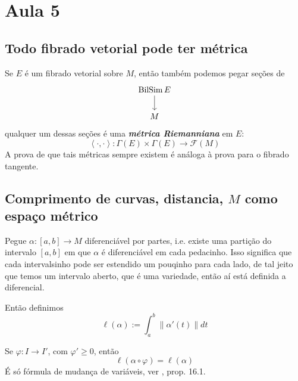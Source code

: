 \section{Aula 5}

\subsection{Todo fibrado vetorial pode ter métrica}

\begin{remark}\leavevmode
Se \(E\) é um fibrado vetorial sobre \(M\), então também podemos pegar seções de
 \[\begin{tikzcd}
\operatorname{B i l Si m}E\arrow[d]\\
M
\end{tikzcd}\]
qualquer um dessas seções é uma \textit{\textbf{métrica Riemanniana}} em \(E\):
\[\left<\cdot,\cdot\right>: \Gamma(E)\times \Gamma(E)\longrightarrow \mathcal{F}(M)\]
A prova de que tais métricas sempre existem é análoga à prova para o fibrado tangente.
\end{remark}

\subsection{Comprimento de curvas, distancia, \(M\) como espaço métrico}

Pegue \(\alpha:[a,b]\longrightarrow M\) diferenciável por partes, i.e. existe uma partição do intervalo \([a,b]\) em que \(\alpha\) é diferenciável em cada pedacinho. Isso significa que cada intervalsinho pode ser estendido um pouqinho para cada lado, de tal jeito que temos um intervalo aberto, que é uma variedade, então aí está definida a diferencial.

Então definimos
\[\ell(\alpha):=\int_a^b \|\alpha'(t)\|dt\]

\begin{remark}\leavevmode
Se \(\varphi:I \to I'\), com \(\varphi' \geq 0\), então
\[\ell(\alpha \circ \varphi) = \ell(\alpha)\]
{\color{4}É só fórmula de mudança de variáveis, ver \cite{tud}, prop. 16.1.}

\end{remark}

